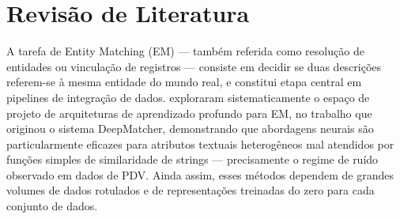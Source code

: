 \documentclass[
    article,
    12pt,
    oneside,
    a4paper,
    english,
    brazilian
    ]{abntex2}
\numberwithin{equation}{section}
\newenvironment{dica}{%
    \par\medskip
    \color{blue!60!black}\small\itshape
}{%
    \par\medskip
}
\begin{document}
\section{Revisão de Literatura}

%
%
%
%

A tarefa de Entity Matching (EM) --- também referida como resolução de entidades ou vinculação de registros --- consiste em decidir se duas descrições referem-se à mesma entidade do mundo real, e constitui etapa central em pipelines de integração de dados.  exploraram sistematicamente o espaço de projeto de arquiteturas de aprendizado profundo para EM, no trabalho que originou o sistema DeepMatcher, demonstrando que abordagens neurais são particularmente eficazes para atributos textuais heterogêneos mal atendidos por funções simples de similaridade de strings --- precisamente o regime de ruído observado em dados de PDV. Ainda assim, esses métodos dependem de grandes volumes de dados rotulados e de representações treinadas do zero para cada conjunto de dados.
\end{document}

